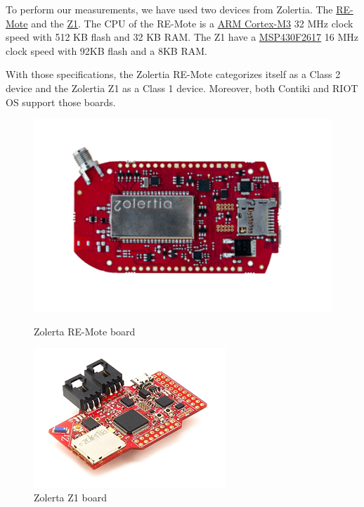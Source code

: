 To perform our measurements, we have used two devices from Zolertia.
The \href{https://github.com/Zolertia/Resources/wiki/RE-Mote}{RE-Mote} and the \href{https://github.com/Zolertia/Resources/wiki/The-Z1-mote}{Z1}.
The CPU of the RE-Mote is a \href{https://developer.arm.com/ip-products/processors/cortex-m/cortex-m3}{ARM Cortex-M3} 32 MHz clock speed with 512 KB flash and 32 KB RAM.
The Z1 have a \href{http://www.ti.com/product/MSP430F2617}{MSP430F2617} 16 MHz clock speed with 92KB flash and a 8KB RAM.

With those specifications, the Zolertia RE-Mote categorizes itself as a Class 2 device and the Zolertia Z1 as a Class 1 device.
Moreover, both Contiki and RIOT OS support those boards.

\begin{figure}[!ht]
    \begin{minipage}{.45\textwidth}
        \centering
        \includegraphics[scale=.5]{assets/remote.png}
        \caption{Zolerta RE-Mote board}
    \end{minipage}\hfill
    \begin{minipage}{.45\textwidth}        
        \centering
        \includegraphics[scale=2.5]{assets/z1.png}
        \caption{Zolerta Z1 board}
    \end{minipage}
\end{figure}

